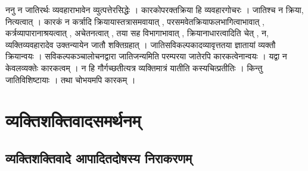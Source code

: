 				\begin{small}
		
					ननु न जातिरर्थः व्यवहाराभावेन व्युत्पत्तेरसिद्धेः । कारकोपरक्तक्रिया हि व्यवहारगोचरः । जातिश्च न क्रिया, नित्यत्वात् । कारकं न कर्त्रादि क्रियायास्तत्रासमवायात् , परसमवेतक्रियाफलभागित्वाभावात् , कर्त्रव्यापारानाश्रयत्वात् , अचेतनत्वात् , तया सह विभागाभावात् , क्रियानाधारत्वादिति चेत् , न, व्यक्तिव्यवहारादेव उक्तन्यायेन जातौ शक्तिग्रहात् । जातिसविकल्पकादव्यावृत्ततया ज्ञातायां व्यक्तौ क्रियान्वयः । सविकल्पकञ्चालोचनद्वारा जातिजन्यमिति परम्परया जातेरपि कारकत्वेनान्वयः । यद्वा न केवलव्यक्तेः कारकत्वम् । न हि गौर्गच्छतीत्यत्र व्यक्तिमात्रं यातीति कस्यचित्प्रतीतिः । किन्तु जातिविशिष्टायाः । तथा चोभयमपि कारकम् ।
				\end{small}
				

	\section{व्यक्तिशक्तिवादसमर्थनम्}

		\subsection{व्यक्तिशक्तिवादे आपादितदोषस्य निराकरणम् }

